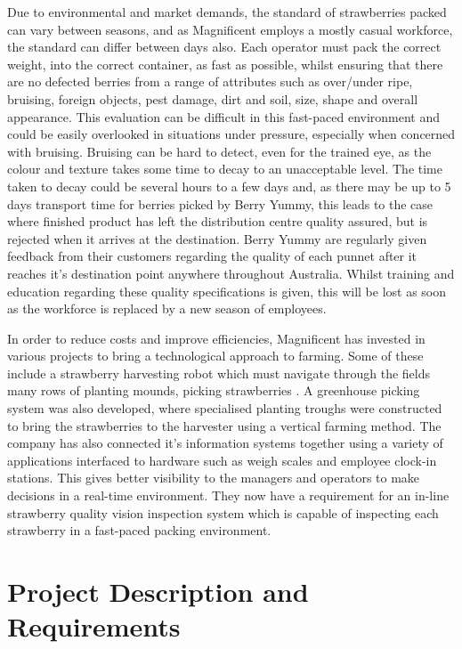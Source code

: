 \documentclass[fleqn,twoside,12pt]{report}
\begin{document}
Due to environmental and market demands, the standard of strawberries packed can vary between seasons, and as Magnificent employs a mostly casual workforce, the standard can differ between days also. Each operator must pack the correct weight, into the correct container, as fast as possible, whilst ensuring that there are no defected berries from a range of attributes such as over/under ripe, bruising, foreign objects, pest damage, dirt and soil, size, shape and overall appearance. This evaluation can be difficult in this fast-paced environment and could be easily overlooked in situations under pressure, especially when concerned with bruising. Bruising can be hard to detect, even for the trained eye, as the colour and texture takes some time to decay to an unacceptable level. The time taken to decay could be several hours to a few days and, as there may be up to 5 days transport time for berries picked by Berry Yummy, this leads to the case where finished product has left the distribution centre quality assured, but is rejected when it arrives at the destination. Berry Yummy are regularly given feedback from their customers regarding the quality of each punnet after it reaches it's destination point anywhere throughout Australia. Whilst training and education regarding these quality specifications is given, this will be lost as soon as the workforce is replaced by a new season of employees.  

In order to reduce costs and improve efficiencies, Magnificent has invested in various projects to bring a technological approach to farming. Some of these include a strawberry harvesting robot which must navigate through the fields many rows of planting mounds, picking strawberries \cite{busch}. A greenhouse picking system was also developed, where specialised planting troughs were constructed to bring the strawberries to the harvester using a vertical farming method. The company has also connected it's information systems together using a variety of applications interfaced to hardware such as weigh scales and employee clock-in stations. This gives better visibility to the managers and operators to make decisions in a real-time environment. They now have a requirement for an in-line strawberry quality vision inspection system which is capable of inspecting each strawberry in a fast-paced packing environment.



\section{Project Description and Requirements}
\label{sec:requirements}
\end{document}
